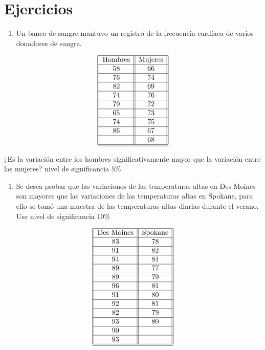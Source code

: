\documentclass[
  a4paper,
  oneside,
  openany]{book}
\providecommand{\tightlist}{%
  \setlength{\itemsep}{0pt}\setlength{\parskip}{0pt}}
\begin{document}
\hypertarget{ejercicios-6}{%
\section{Ejercicios}\label{ejercicios-6}}

\begin{enumerate}
\def\labelenumi{\arabic{enumi}.}
\tightlist
\item
  Un banco de sangre mantuvo un registro de la frecuencia cardíaca de varios donadores de sangre.
\end{enumerate}

\[
\begin{array}{||c| |c||} 
\hline 
\mbox{Hombres}& \mbox{Mujeres} \\  
 \hline
58&66\\
 \hline
76&74\\
 \hline
82&69\\
 \hline
74&76\\
 \hline
79&72\\
 \hline
65&73\\
 \hline
74&75\\
 \hline
86&67\\
 \hline
&68\\
 \hline
\hline
\end{array}
\]

¿Es la variación entre los hombres significativamente mayor que la variación entre las mujeres? nivel de significancia \(5\%\)

\begin{enumerate}
\def\labelenumi{\arabic{enumi}.}
\setcounter{enumi}{1}
\tightlist
\item
  Se desea probar que las variaciones de las temperaturas altas en Des Moines son mayores que las variaciones de las temperaturas altas en Spokane, para ello se tomó una muestra de las temperaturas altas diarias durante el verano. Use nivel de significancia \(10\%\)
\end{enumerate}

\[
\begin{array}{||c| |c||} 
\hline 
\mbox{Des Moines}& \mbox{Spokane} \\ 
 \hline
83&78\\
 \hline
91&82\\
 \hline
94&81\\
 \hline
89&77\\
 \hline
89&79\\
 \hline
96&81\\
 \hline
91&80\\
 \hline
92&81\\
 \hline
82&79\\
 \hline
93&80\\
 \hline
90&\\
 \hline
93&\\
 \hline
\hline
\end{array}
\]
\end{document}
